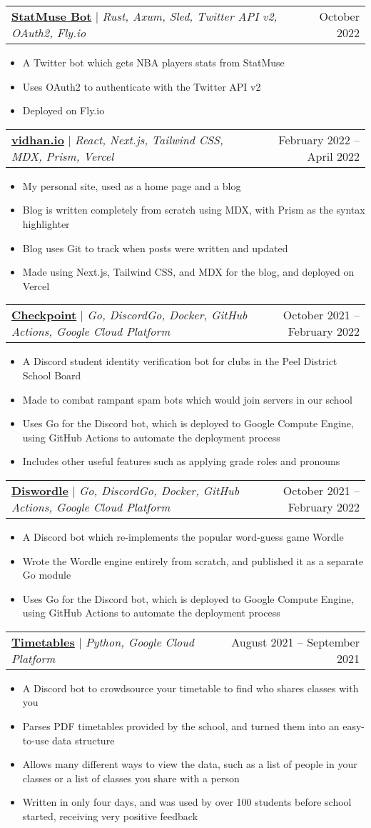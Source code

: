 \documentclass[letterpaper,11pt]{article}
\makeatletter
\newcommand{\resumeItem}[1]{
  \item\small{
    {#1 \vspace{-2pt}}
  }
}
\newcommand{\resumeProjectHeading}[2]{
    \item
    \begin{tabular*}{0.97\textwidth}{l@{\extracolsep{\fill}}r}
      \small#1 & #2 \\
    \end{tabular*}\vspace{-7pt}
}
\newcommand{\resumeItemListStart}{\begin{itemize}}
\newcommand{\resumeItemListEnd}{\end{itemize}\vspace{-5pt}}
\makeatother
\begin{document}
\resumeProjectHeading
{\textbf{\href{https://github.com/vidhanio/statmuse-bot}{StatMuse Bot}} $|$ \emph{Rust, Axum, Sled, Twitter API v2, OAuth2, Fly.io}}{October 2022}
\resumeItemListStart
\resumeItem{A Twitter bot which gets NBA players stats from StatMuse}
\resumeItem{Uses OAuth2 to authenticate with the Twitter API v2}
\resumeItem{Deployed on Fly.io}
\resumeItemListEnd

\resumeProjectHeading
{\textbf{\href{https://github.com/vidhanio/site}{vidhan.io}} $|$ \emph{React, Next.js, Tailwind CSS, MDX, Prism, Vercel}}{February 2022 -- April 2022}
\resumeItemListStart
\resumeItem{My personal site, used as a home page and a blog}
\resumeItem{Blog is written completely from scratch using MDX, with Prism as the syntax highlighter}
\resumeItem{Blog uses Git to track when posts were written and updated}
\resumeItem{Made using Next.js, Tailwind CSS, and MDX for the blog, and deployed on Vercel}
\resumeItemListEnd

\resumeProjectHeading
{\textbf{\href{https://github.com/vidhanio/checkpoint}{Checkpoint}} $|$ \emph{Go, DiscordGo, Docker, GitHub Actions, Google Cloud Platform}}{October 2021 -- February 2022}
\resumeItemListStart
\resumeItem{A Discord student identity verification bot for clubs in the Peel District School Board}
\resumeItem{Made to combat rampant spam bots which would join servers in our school}
\resumeItem{Uses Go for the Discord bot, which is deployed to Google Compute Engine, using GitHub Actions to automate the deployment process}
\resumeItem{Includes other useful features such as applying grade roles and pronouns}
\resumeItemListEnd

\resumeProjectHeading
{\textbf{\href{https://github.com/vidhanio/diswordle}{Diswordle}} $|$ \emph{Go, DiscordGo, Docker, GitHub Actions, Google Cloud Platform}}{October 2021 -- February 2022}
\resumeItemListStart
\resumeItem{A Discord bot which re-implements the popular word-guess game Wordle}
\resumeItem{Wrote the Wordle engine entirely from scratch, and published it as a separate Go module}
\resumeItem{Uses Go for the Discord bot, which is deployed to Google Compute Engine, using GitHub Actions to automate the deployment process}
\resumeItemListEnd

\resumeProjectHeading
{\textbf{\href{https://github.com/vidhanio/timetables}{Timetables}} $|$ \emph{Python, Google Cloud Platform}}{August 2021 -- September 2021}
\resumeItemListStart
\resumeItem{A Discord bot to crowdsource your timetable to find who shares classes with you}
\resumeItem{Parses PDF timetables provided by the school, and turned them into an easy-to-use data structure}
\resumeItem{Allows many different ways to view the data, such as a list of people in your classes or a list of classes you share with a person}
\resumeItem{Written in only four days, and was used by over 100 students before school started, receiving very positive feedback}
\resumeItemListEnd
\end{document}
